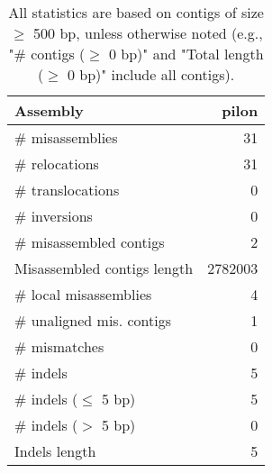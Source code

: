 \documentclass[12pt,a4paper]{article}
\begin{document}
\begin{table}[ht]
\begin{center}
\caption{All statistics are based on contigs of size $\geq$ 500 bp, unless otherwise noted (e.g., "\# contigs ($\geq$ 0 bp)" and "Total length ($\geq$ 0 bp)" include all contigs).}
\begin{tabular}{|l*{1}{|r}|}
\hline
Assembly & pilon \\ \hline
\# misassemblies & 31 \\ \hline
\hspace{5mm}\# relocations & 31 \\ \hline
\hspace{5mm}\# translocations & 0 \\ \hline
\hspace{5mm}\# inversions & 0 \\ \hline
\# misassembled contigs & 2 \\ \hline
Misassembled contigs length & 2782003 \\ \hline
\# local misassemblies & 4 \\ \hline
\# unaligned mis. contigs & 1 \\ \hline
\# mismatches & 0 \\ \hline
\# indels & 5 \\ \hline
\hspace{5mm}\# indels ($\leq$ 5 bp) & 5 \\ \hline
\hspace{5mm}\# indels ($>$ 5 bp) & 0 \\ \hline
Indels length & 5 \\ \hline
\end{tabular}
\end{center}
\end{table}
\end{document}
